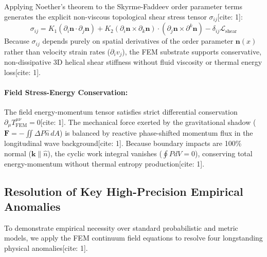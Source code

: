 \documentclass[11pt,a4paper]{article}
\begin{document}
	Applying Noether's theorem to the Skyrme-Faddeev order parameter terms generates the explicit non-viscous topological shear stress tensor $\sigma_{ij}$[cite: 1]:
	\begin{equation}
		\sigma_{ij} = K_1 (\partial_i \mathbf{n} \cdot \partial_j \mathbf{n}) + K_2 (\partial_i \mathbf{n} \times \partial_k \mathbf{n}) \cdot (\partial_j \mathbf{n} \times \partial^k \mathbf{n}) - \delta_{ij} \mathcal{L}_{\text{shear}}
	\end{equation}
	Because $\sigma_{ij}$ depends purely on spatial derivatives of the order parameter $\mathbf{n}(x)$ rather than velocity strain rates ($\partial_i v_j$), the FEM substrate supports conservative, non-dissipative 3D helical shear stiffness without fluid viscosity or thermal energy loss[cite: 1].
	
	\paragraph{Field Stress-Energy Conservation:}
	The field energy-momentum tensor satisfies strict differential conservation $\partial_\mu T^{\mu\nu}_{\text{FEM}} = 0$[cite: 1]. The mechanical force exerted by the gravitational shadow ($\mathbf{F} = -\iint \Delta P \hat{n} \, dA$) is balanced by reactive phase-shifted momentum flux in the longitudinal wave background[cite: 1]. Because boundary impacts are 100\% normal ($\mathbf{k} \parallel \hat{n}$), the cyclic work integral vanishes ($\oint P dV = 0$), conserving total energy-momentum without thermal entropy production[cite: 1].
	
	\subsection{Resolution of Key High-Precision Empirical Anomalies}
	To demonstrate empirical necessity over standard probabilistic and metric models, we apply the FEM continuum field equations to resolve four longstanding physical anomalies[cite: 1].
	
\end{document}
